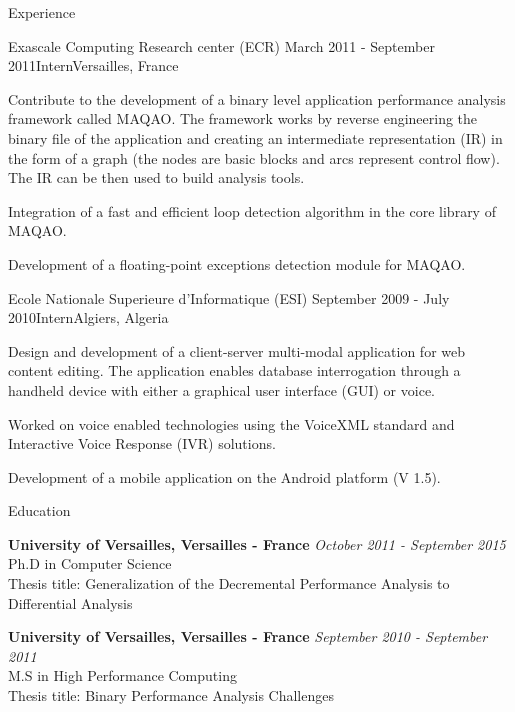 \documentclass{resume} %
\begin{document}
\begin{rSection}{Experience}
\begin{rSubsection}{Exascale Computing Research center (ECR)}
                   {March 2011 - September 2011}{Intern}{Versailles, France}
\item Contribute to the development of a binary level application performance 
      analysis framework called MAQAO. The framework works by reverse engineering 
      the binary file of the application and creating an intermediate representation 
      (IR) in the form of a graph (the nodes are basic blocks and arcs represent 
      control flow). The IR can be then used to build analysis tools.  
\item Integration of a fast and efficient loop detection algorithm in the core 
      library of MAQAO.  
\item Development of a floating-point exceptions detection module for MAQAO.
\end{rSubsection}


\begin{rSubsection}{Ecole Nationale Superieure d'Informatique (ESI)}
                   {September 2009 - July 2010}{Intern}{Algiers, Algeria}
\item Design and development of a client-server multi-modal application for web 
      content editing. The application enables database interrogation through a 
      handheld device with either a graphical user interface (GUI) or voice.
\item Worked on voice enabled technologies using the VoiceXML standard and 
      Interactive Voice Response (IVR) solutions.
\item Development of a mobile application on the Android platform (V 1.5).  
\end{rSubsection}

\newpage

\begin{rSection}{Education}

{\bf University of Versailles, Versailles - France} \hfill {\em October 2011 - September 2015} \\ 
Ph.D in Computer Science\\
Thesis title: Generalization of the Decremental Performance Analysis to Differential Analysis

{\bf University of Versailles, Versailles - France} \hfill {\em September 2010 - September 2011} \\ 
M.S in High Performance Computing\\
Thesis title: Binary Performance Analysis Challenges


\end{rSection}
\end{rSection}
\end{document}
